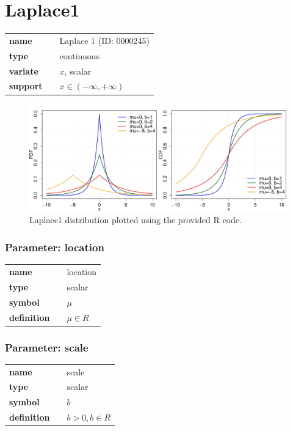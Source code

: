 \section*{Laplace1} 

  \bigskip 

\begin{tabular}{p{2cm}cl}
\textbf{name} & & Laplace 1 (ID: 0000245)\\ 
 
\textbf{type} & & continuous \\ 

\textbf{variate} & & $x$, scalar \\ 

\textbf{support} & & $x \in (-\infty,+\infty)$
\end{tabular}

\begin{figure}[ht!]
\centering
  \includegraphics[width=140mm]{pics/Laplace1.pdf}
 \caption{Laplace1 distribution plotted using the provided R code.}
 \label{fig:Laplace1}
\end{figure}

\subsubsection*{Parameter: location}

\noindent\begin{tabular}{p{2cm}cl}
\textbf{name} & & location \\
\textbf{type} & & scalar \\
\textbf{symbol} & & $\mu$  \\
\textbf{definition} & & $\mu \in R$
\end{tabular}
\subsubsection*{Parameter: scale}

\noindent\begin{tabular}{p{2cm}cl}
\textbf{name} & & scale \\
\textbf{type} & & scalar \\
\textbf{symbol} & & $b$  \\
\textbf{definition} & & $b > 0, b \in R$
\end{tabular}
